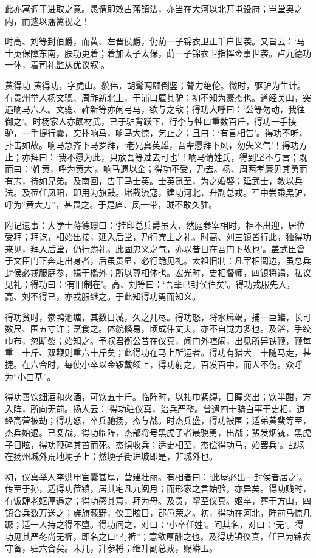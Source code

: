 \documentclass[]{article}
\begin{document}
此亦寓调于进取之意。愚谓即效古藩镇法，亦当在大河以北开屯设府；岂堂奥之内，而遽以藩篱视之！

时高、刘等封伯爵，而黄、左晋侯爵，仍荫一子锦衣卫正千户世袭。又旨云：`马士英保障东南，肤功更着；着加太子太保，荫一子锦衣卫指挥佥事世袭。卢九德功一体，着司礼监从优议叙'。

黄得功
黄得功，字虎山。貌伟，胡髯两颐倒竖；膂力绝伦。微时，驱驴为生计。有贵州举人杨文骢、周祚新北上，于浦口雇其驴；初不知为豪杰也。道经关山，突遇响马六人。文骢、祚新等亦闲弓马，欲与之敌；得功大呼曰：`公等勿动，我往御之'。时杨家人亦颇材武，已于驴背跃下，行李与牲口重数百斤，得功一手挟驴，一手提行囊，突扑响马，响马大惊，乞止之；且曰：`有言相告'。得功不听，扑击如故。响马急齐下马罗拜，`老兄真英雄，吾辈愿拜下风，勿失义气'！得功方止；亦拜曰：`我不愿为此，只放吾等过去可也'！响马请姓氏，得到坚不与言；既而曰：`姓黄，呼为黄大'。响马遗以金；得功不受，乃去。杨、周两孝廉见其勇而有志，待如兄弟。及南回，告于马士英。士英觅至，为之婚娶；延武士，教以兵法。及莅任凤阳，即用为旗鼓。堵截流寇，建功河北，升副总戎。军中尝乘黑驴，呼为``黄大刀''，甚畏之。于是庐、凤一带，贼不敢久驻。

附记遗事：大学士蒋德璟曰：`挂印总兵爵虽大，然庭参宰相时，相不出迎，居位受拜；拜讫，相始出接，延入后堂，乃行宾主之礼。时高、刘三镇皆行此，独得功来见，拜入后堂，仍行跪礼。此固忠义之气，亦以昔日在吾门下故也'。盖武臣曾于文臣门下奔走出身者，后虽贵显，必行跪见礼。太祖旧制：凡宰相阅边，虽总兵封侯必戎服庭参，揖于槛外；所以尊相体也。宏光时，史相督师，四镇将谒，私议见礼；得功曰：`有旧制在'。高、刘等曰：`吾辈已封侯伯矣'。得功戎服先入，高、刘不得已，亦戎服继之。于此知得功勇而知义。

得功贫时，豢鸭池塘，其数日减，久之几尽。得功怒，将水戽竭，捕一巨鳝，长可数尺、围五寸许；烹食之。体貌倏易，顷成伟丈夫，亦不自觉力多也。及浴，手绞巾布，忽断裂；始知之。予叔君衡公昔在仪真，闻门外喧闹，出见所舁铁鞭，鞭每重三十斤、双鞭则重六十斤矣；此得功在马上所运者。得功有猎犬三十随马走，甚捷。在六合时，每使小卒以金锣戴额上，得功射之，百发百中，而人不伤。众呼为``小由基''。

得功善饮细酒和火酒，可饮五十斤。临阵时，以扎巾紧缚，目瞳突出；饮半酣，方入阵，所向无前。扬人云：`得功驻仪真，治兵严整。曾遣四十骑白事于史相，道经高营被劫；得功怒，卒兵驰扬，杰与战。时杰兵盛，得功被围；适弟黄蜚等至，杰兵始退。已复战，得功临阵，杰部将号黑虎子者最骁勇，出战；蜚发烟铳，黑虎子目眩，得功鞭碎其首而死。杰惧收兵；适史相至，杰偿得功马，始罢兵'。战场在扬州城外荒地埂子上；然埂子街进城即是，非城外也。

初，仪真举人李洪甲宦囊甚厚，营建壮丽。有相者曰：`此屋必出一封侯者居之'。传至于孙，适得功莅镇，居其宅凡九阅月；而形家之言始验，亦异矣。得功贱时，有饭肆老妪厚遇之；得功感其意，拜为母。及贵，挈至仪真。妪卒，葬于方山，四镇合兵数万送之；旌旗蔽野，仪卫眩目，郡邑荣之。初，得功在河北，阵前马惊几蹶；适一人持之得不堕。得功问之，对曰：`小卒任姓'。问其名，对曰：`无'。得功见其严冬尚无裤，即名之曰``有裤''；意欲厚酬之也。及得功镇仪真，任已为锦衣守备，驻六合矣。未几，升参将；继升副总戎，赐蟒玉。
\end{document}
